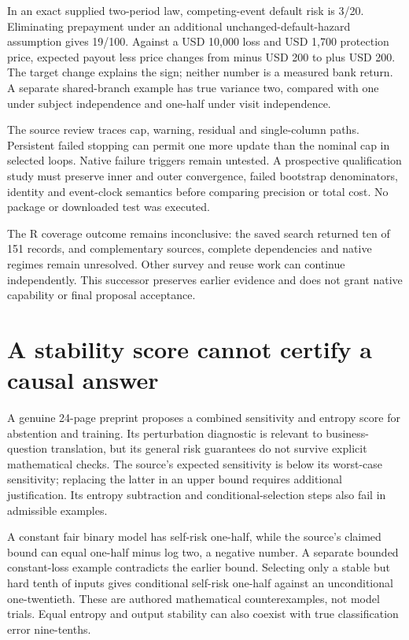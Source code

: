 In an exact supplied two-period law, competing-event default risk is
3/20. Eliminating prepayment under an additional
unchanged-default-hazard assumption gives 19/100. Against a USD 10,000
loss and USD 1,700 protection price, expected payout less price changes
from minus USD 200 to plus USD 200. The target change explains the sign;
neither number is a measured bank return. A separate shared-branch
example has true variance two, compared with one under subject
independence and one-half under visit independence.
\citep{exec23_longr_reference}

The source review traces cap, warning, residual and single-column paths.
Persistent failed stopping can permit one more update than the nominal
cap in selected loops. Native failure triggers remain untested. A
prospective qualification study must preserve inner and outer
convergence, failed bootstrap denominators, identity and event-clock
semantics before comparing precision or total cost. No package or
downloaded test was executed.
\citep{exec23_longr_stremr,exec23_longr_survtmle}

The R coverage outcome remains inconclusive: the saved search returned
ten of 151 records, and complementary sources, complete dependencies and
native regimes remain unresolved. Other survey and reuse work can
continue independently. This successor preserves earlier evidence and
does not grant native capability or final proposal acceptance.
\citep{sp23longr_reader,sp23longr_progress}

\hypertarget{a-stability-score-cannot-certify-a-causal-answer}{%
\section{A stability score cannot certify a causal
answer}\label{a-stability-score-cannot-certify-a-causal-answer}}

A genuine 24-page preprint proposes a combined sensitivity and entropy
score for abstention and training. Its perturbation diagnostic is
relevant to business-question translation, but its general risk
guarantees do not survive explicit mathematical checks. The source's
expected sensitivity is below its worst-case sensitivity; replacing the
latter in an upper bound requires additional justification. Its entropy
subtraction and conditional-selection steps also fail in admissible
examples. \citep{exec23_sua_original}

A constant fair binary model has self-risk one-half, while the source's
claimed bound can equal one-half minus log two, a negative number. A
separate bounded constant-loss example contradicts the earlier bound.
Selecting only a stable but hard tenth of inputs gives conditional
self-risk one-half against an unconditional one-twentieth. These are
authored mathematical counterexamples, not model trials. Equal entropy
and output stability can also coexist with true classification error
nine-tenths. \citep{exec23_sua_counterexamples}

